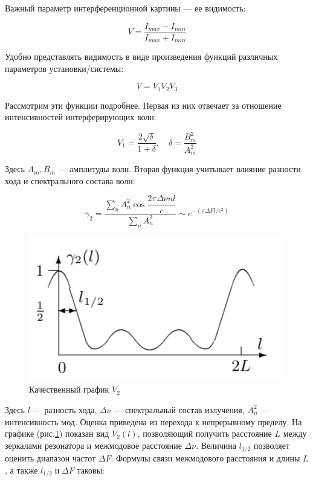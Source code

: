 \documentclass[12pt]{kiarticle} %
\begin{document}
	Важный параметр интерференционной картины --- ее видимость:
	
	\begin{equation}\label{V0}
	V = \dfrac{I_{max} - I_{min}}{I_{max} + I_{min}}
	\end{equation}
	
	Удобно представлять видимость в виде произведения функций различных параметров установки/системы:
	
	\begin{equation}\label{VVV}
	V = V_1 V_2 V_3
	\end{equation}
	
	Рассмотрим эти функции подробнее. Первая из них отвечает за отношение интенсивностей интерферирующих волн:
	
	\begin{equation}\label{V1}
	V_1 = \dfrac{2\sqrt{\delta}}{1 + \delta}, \quad \delta = \dfrac{B_m^2}{A_m^2}
	\end{equation}
	
	
	Здесь $ A_m, B_m $ --- амплитуды волн. Вторая функция учитывает влияние разности хода и спектрального состава волн:
	
	
	\begin{equation}\label{}
	\gamma_2 = \dfrac{\sum\limits_n A_n^2 \cos{\dfrac{2\pi \Delta \nu n l}{c}}}{\sum\limits_n A_n^2} \sim e^{-(\pi \Delta F l /c^2)}
	\end{equation}
	
		\begin{figure} 
		\includegraphics[width=\linewidth]{v2.png}
		\caption{Качественный график $ V_2 $}
		\label{V2graf}
	\end{figure}
	
	
	Здесь $ l $ --- разность хода, $ \Delta\nu $ --- спектральный состав излучения, $ A_n^2 $ --- интенсивность мод. Оценка приведена из перехода к непрерывному пределу. На графике (рис.\ref{V2graf}) показан вид $ V_2(l) $, позволяющий получить расстояние $ L $ между зеркалами резонатора и межмодовое расстояние $ \Delta \nu $. Величина $ l_{1/2} $  позволяет оценить диапазон частот $ \Delta F $.
	Формулы связи межмодового расстояния и длины $ L $, а также $ l_{1/2} \; и \; \Delta F $ таковы:
	
\end{document}
